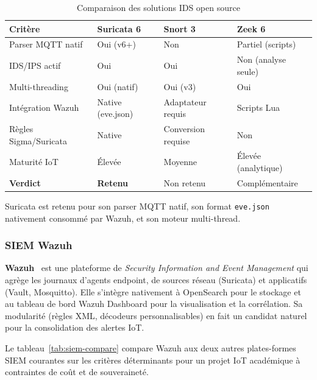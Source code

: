 \begin{table}[!htbp]
\centering
\caption{Comparaison des solutions IDS open source}
\label{tab:ids-compare}
\small
\begin{tabularx}{\linewidth}{|l|X|X|X|}
\hline
\textbf{Critère} & \textbf{Suricata 6} & \textbf{Snort 3} & \textbf{Zeek 6} \\
\hline
Parser MQTT natif    & Oui (v6+)     & Non           & Partiel (scripts) \\ \hline
IDS/IPS actif        & Oui           & Oui           & Non (analyse seule) \\ \hline
Multi-threading      & Oui (natif)   & Oui (v3)      & Oui \\ \hline
Intégration Wazuh    & Native (eve.json) & Adaptateur requis & Scripts Lua \\ \hline
Règles Sigma/Suricata & Native       & Conversion requise & Non \\ \hline
Maturité IoT         & Élevée        & Moyenne       & Élevée (analytique) \\ \hline
\textbf{Verdict}     & \textbf{Retenu} & Non retenu   & Complémentaire \\ \hline
\end{tabularx}
\end{table}

Suricata est retenu pour son parser MQTT natif, son format \texttt{eve.json} nativement consommé par Wazuh, et son moteur multi-thread.

\subsubsection{SIEM Wazuh}

\textbf{Wazuh}~\cite{wazuh_docs} est une plateforme de \emph{Security Information and Event Management} qui agrège les journaux d'agents endpoint, de sources réseau (Suricata) et applicatifs (Vault, Mosquitto). Elle s'intègre nativement à OpenSearch pour le stockage et au tableau de bord Wazuh Dashboard pour la visualisation et la corrélation. Sa modularité (règles XML, décodeurs personnalisables) en fait un candidat naturel pour la consolidation des alertes IoT.

Le tableau~\ref{tab:siem-compare} compare Wazuh aux deux autres plates-formes SIEM courantes sur les critères déterminants pour un projet IoT académique à contraintes de coût et de souveraineté.

